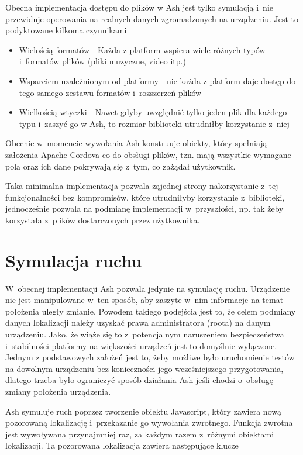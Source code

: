 \documentclass[brudnopis]{xmgr}
\begin{document}
Obecna implementacja dostępu do plików w Ash jest tylko symulacją i~nie przewiduje operowania na realnych danych zgromadzonych na urządzeniu. Jest to podyktowane kilkoma czynnikami

\begin{itemize}
  \item Wielością formatów - Każda z platform wspiera wiele różnych typów i~formatów plików (pliki muzyczne, video itp.) 
  \item Wsparciem uzależnionym od platformy - nie każda z platform daje dostęp do tego samego zestawu formatów i~rozszerzeń plików
  \item Wielkością wtyczki - Nawet gdyby uwzględnić tylko jeden plik dla każdego typu i~zaszyć go w Ash, to rozmiar biblioteki utrudniłby korzystanie z~niej
\end{itemize}

Obecnie w~momencie wywołania Ash konstruuje obiekty, który spełniają założenia Apache Cordova co do obsługi plików, tzn. mają wszystkie wymagane pola oraz ich dane pokrywają się z~tym, co zażądał użytkownik. 

Taka minimalna implementacja pozwala ząjednej strony  nakorzystanie z~tej funkcjonalności bez kompromisów, które utrudniłyby korzystanie z~biblioteki, jednocześnie pozwala na podmianę implementacji w~przyszłości, np. tak żeby korzystała z~plików dostarczonych przez użytkownika.

\section{Symulacja ruchu}

W~obecnej implementacji Ash pozwala jedynie na symulację ruchu. Urządzenie nie jest manipulowane w~ten sposób, aby zaszyte w~nim informacje na temat położenia uległy zmianie. Powodem takiego podejścia jest to, że celem podmiany danych lokalizacji należy uzyskać prawa administratora (roota) na danym urządzeniu. Jako, że wiąże się to z~potencjalnym naruszeniem bezpieczeństwa i~stabilności platformy na większości urządzeń jest to domyślnie wyłączone. Jednym z podstawowych założeń jest to, żeby możliwe było uruchomienie testów na dowolnym urządzeniu bez konieczności jego wcześniejszego przygotowania, dlatego trzeba było ograniczyć sposób działania Ash jeśli chodzi o~obsługę zmiany położenia urządzenia. 

Ash symuluje ruch poprzez tworzenie obiektu Javascript, który zawiera nową pozorowaną lokalizację i~przekazanie go wywołania zwrotnego. Funkcja zwrotna jest wywoływana przynajmniej raz, za każdym razem z~różnymi obiektami lokalizacji. Ta pozorowana lokalizacja zawiera następujące klucze
\end{document}
